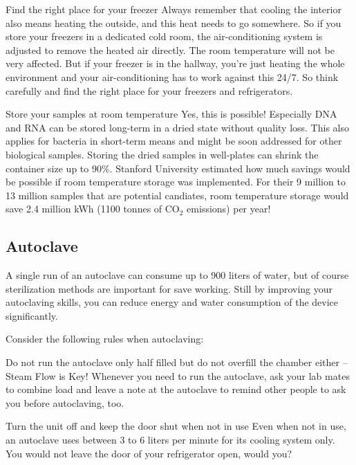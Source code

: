 \begin{suggest}{Find the right place for your freezer}
	Always remember that cooling the interior also means heating the outside, and this heat needs to go somewhere. So if you store your freezers in a dedicated cold room, the air-conditioning system is adjusted to remove the heated air directly. The room temperature will not be very affected.
	But if your freezer is in the hallway, you're just heating the whole environment and your air-conditioning has to work against this 24/7. So think carefully and find the right place for your freezers and refrigerators.
\end{suggest}	

\begin{suggest} {Store your samples at room temperature}
	Yes, this is possible! Especially DNA and RNA can be stored long-term in a dried state without quality loss. This also applies for bacteria in short-term means and might be soon addressed for other biological samples. Storing the dried samples in well-plates can shrink the container size up to 90\%. \cite{RT_storage} Stanford University estimated how much savings would be possible if room temperature storage was implemented. For their 9 million to 13 million samples that are potential candiates, room temperature storage would save 2.4 million kWh (1100 tonnes of CO$_2$ emissions) per year! \cite{stanford}
\end{suggest}	

\subsection{Autoclave} 
A single run of an autoclave can consume up to 900 liters of water, but of course sterilization methods are important for save working. Still by improving your autoclaving skills, you can reduce energy and water consumption of the device significantly.
 
Consider the following rules when autoclaving:

\begin{suggest}{Do not run the autoclave only half filled but do not overfill the chamber either – Steam Flow is Key!}
	Whenever you need to run the autoclave, ask your lab mates to combine load and leave a note at the autoclave to remind other people to ask you before autoclaving, too. 

\end{suggest} 

\begin{suggest}{Turn the unit off and keep the door shut when not in use }
	Even when not in use, an autoclave uses between 3 to 6 liters per minute for its cooling system only.\\ 
	You would not leave the door of your refrigerator open, would you? 
	
\end{suggest} 

